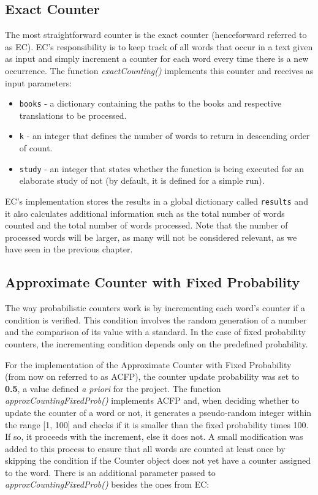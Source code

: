 \documentclass[shortpaper]{revdetua}
\begin{document}
\subsection{Exact Counter}

The most straightforward counter is the exact counter (henceforward referred to 
as EC). EC's responsibility is to keep track of all words that occur in a text 
given as input and simply increment a counter for each word every time there is 
a new occurrence.
The function \textit{exactCounting()} implements this counter and receives as 
input parameters:

\begin{itemize}
    \item \texttt{books} - a dictionary containing the paths to the books and respective translations to be processed.
    \item \texttt{k} - an integer that defines the number of words to return in descending order of count.
    \item \texttt{study} - an integer that states whether the function is being executed for an elaborate study of not (by default, it is defined for a simple run).
\end{itemize}

EC's implementation stores the results in a global dictionary called 
\texttt{results} and it also calculates additional information such as the total 
number of words counted and the total number of words processed.
Note that the number of processed words will be larger, as many will not be 
considered relevant, as we have seen in the previous chapter.

\subsection{Approximate Counter with Fixed Probability}

The way probabilistic counters work is by incrementing each word's counter if 
a condition is verified. 
This condition involves the random generation of a number and the comparison of
its value with a standard.
In the case of fixed probability counters, the incrementing condition depends 
only on the predefined probability.

For the implementation of the Approximate Counter with Fixed Probability (from 
now on referred to as ACFP), the counter update probability was set to \textbf{0.5},
a value defined \textit{a priori} for the project.
The function \textit{approxCountingFixedProb()} implements ACFP and, when deciding
whether to update the counter of a word or not, it generates a pseudo-random 
integer within the range [1, 100] and checks if it is smaller than the fixed
probability times 100. If so, it proceeds with the increment, else it does not.
A small modification was added to this process to ensure that all words are 
counted at least once by skipping the condition if the Counter object does not 
yet have a counter assigned to the word.
There is an additional parameter passed to \textit{approxCountingFixedProb()} 
besides the ones from EC:
\end{document}
